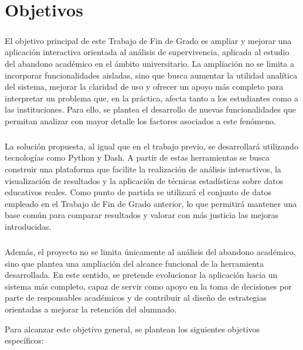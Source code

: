 \chapter{Objetivos}
\label{ch:objetivos}
 

\paragraph*{}El objetivo principal de este Trabajo de Fin de Grado es ampliar y mejorar una aplicación interactiva orientada al análisis de supervivencia, aplicada al estudio del abandono académico en el ámbito universitario. La ampliación no se limita a incorporar funcionalidades aisladas, sino que busca aumentar la utilidad analítica del sistema, mejorar la claridad de uso y ofrecer un apoyo más completo para interpretar un problema que, en la práctica, afecta tanto a los estudiantes como a las instituciones. Para ello, se plantea el desarrollo de nuevas funcionalidades que permitan analizar con mayor detalle los factores asociados a este fenómeno.

\paragraph*{}La solución propuesta, al igual que en el trabajo previo, se desarrollará utilizando tecnologías como Python y Dash. A partir de estas herramientas se busca construir una plataforma que facilite la realización de análisis interactivos, la visualización de resultados y la aplicación de técnicas estadísticas sobre datos educativos reales. Como punto de partida se utilizará el conjunto de datos empleado en el Trabajo de Fin de Grado anterior, lo que permitirá mantener una base común para comparar resultados y valorar con más justicia las mejoras introducidas.

\paragraph*{}Además, el proyecto no se limita únicamente al análisis del abandono académico, sino que plantea una ampliación del alcance funcional de la herramienta desarrollada. En este sentido, se pretende evolucionar la aplicación hacia un sistema más completo, capaz de servir como apoyo en la toma de decisiones por parte de responsables académicos y de contribuir al diseño de estrategias orientadas a mejorar la retención del alumnado.

Para alcanzar este objetivo general, se plantean los siguientes objetivos específicos:

